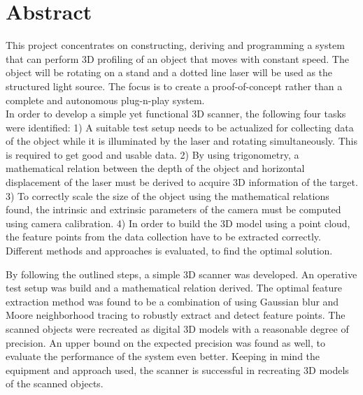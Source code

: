 \section*{Abstract}


This project concentrates on constructing, deriving and programming a system that can perform 3D profiling of an object that moves with constant speed. The object will be rotating on a stand and a dotted line laser will be used as the structured light source. The focus is to create a proof-of-concept rather than a complete and autonomous plug-n-play system.\\ 


In order to develop a simple yet functional 3D scanner, the following four tasks were identified:
1) A suitable test setup needs to be actualized for collecting data of the object while it is illuminated by the laser and rotating simultaneously. This is required to get good and usable data. 2) By using trigonometry, a mathematical relation between the depth of the object and horizontal displacement of the laser must be derived to acquire 3D information of the target. 3) To correctly scale the size of the object using the mathematical relations found, the intrinsic and extrinsic parameters of the camera must be computed using camera calibration. 4) In order to build the 3D model using a point cloud, the feature points from the data collection have to be extracted correctly. Different methods and approaches is evaluated, to find the optimal solution. 

By following the outlined steps, a simple 3D scanner was developed. An operative test setup was build and a mathematical relation derived. The optimal feature extraction method was found to be a combination of using Gaussian blur and Moore neighborhood tracing to robustly extract and detect feature points. The scanned objects were recreated as digital 3D models with a reasonable degree of precision. An upper bound on the expected precision was found as well, to evaluate the performance of the system even better. Keeping in mind the equipment and approach used, the scanner is successful in recreating 3D models of the scanned objects. 



